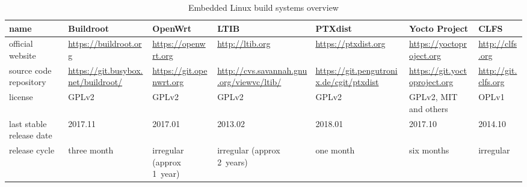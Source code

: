 \documentclass[printmode]{mgr}
\begin{document}
\begin{landscape}




\begin{table}
  \begin{tabular}{| p{2cm} | p{3cm} | p{3cm} | p{3cm} | p{3cm} | p{3cm} | p{3cm} |}
    \hline
    name & Buildroot & OpenWrt & LTIB & PTXdist & Yocto Project & CLFS \\
    \hline
    official website & \url{https://buildroot.org} & \url{https://openwrt.org} & \url{http://ltib.org} & \url{https://ptxdist.org} & \url{https://yoctoproject.org} & \url{http://clfs.org}\\
    \hline
    source code repository & \url{https://git.busybox.net/buildroot/} & \url{https://git.openwrt.org} & \url{http://cvs.savannah.gnu.org/viewvc/ltib/} & \url{https://git.pengutronix.de/cgit/ptxdist} & \url{https://git.yoctoproject.org} & \url{http://git.clfs.org} \\
    \hline
    license & GPLv2\cite{web:buildroot-license} & GPLv2\cite{web:openwrt-license} & GPLv2\cite{web:ltib-license} & GPLv2\cite{web:ptxdist-license} & GPLv2, MIT and others\cite{web:yoctoproject-license} & OPLv1\cite{web:clfs-license} \\
    \hline
    last stable release date & 2017.11 & 2017.01 & 2013.02 & 2018.01 & 2017.10 & 2014.10\\
    \hline
    release cycle & three month\cite{web:buildroot-releases} & irregular (approx 1~year) & irregular (approx 2~years)\cite{web:ltib-releases} & one month\cite{web:ptxdist-releases} & six months\cite{web:yoctoproject-releases} & irregular\cite{web:clfs-releases}\\
    \hline
  \end{tabular}
  \caption{Embedded Linux build systems overview}
\end{table}

\end{landscape}



\end{document}
